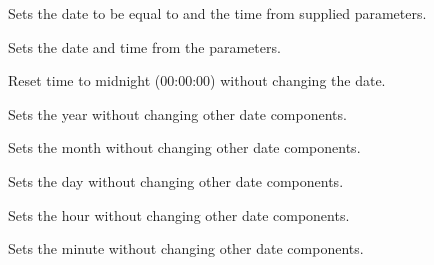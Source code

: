 Sets the date to be equal to  and the time
from supplied parameters.



\label{wxdatetimesetdate}


Sets the date and time from the parameters.


\label{wxdatetimeresettime}


Reset time to midnight (00:00:00) without changing the date.


\label{wxdatetimesetyear}


Sets the year without changing other date components.


\label{wxdatetimesetmonth}


Sets the month without changing other date components.


\label{wxdatetimesetday}


Sets the day without changing other date components.


\label{wxdatetimesethour}


Sets the hour without changing other date components.


\label{wxdatetimesetminute}


Sets the minute without changing other date components.


\label{wxdatetimesetsecond}

